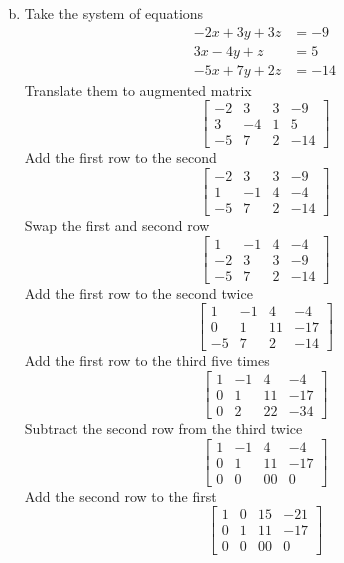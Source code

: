 \documentclass[../main.tex]{subfiles}
\begin{document}
\solution
\begin{enumerate}[a)]
	\setcounter{enumi}{1}
	\item 
		Take the system of equations
		\begin{align*}
			-2x + 3y + 3z &= -9 \\
			3x - 4y + z &= 5 \\
			-5x + 7y + 2z &= -14
		\end{align*}
		Translate them to augmented matrix
		$$\left[\begin{array}{ccc|c}
			-2 & 3 & 3 & -9 \\
			3 & -4 & 1 & 5 \\
			-5 & 7 & 2 & -14
		\end{array}\right]$$
		Add the first row to the second
		$$\left[\begin{array}{ccc|c}
			-2 & 3 & 3 & -9 \\
			1 & -1 & 4 & -4 \\
			-5 & 7 & 2 & -14
		\end{array}\right]$$
		Swap the first and second row
		$$\left[\begin{array}{ccc|c}
			1 & -1 & 4 & -4 \\
			-2 & 3 & 3 & -9 \\
			-5 & 7 & 2 & -14
		\end{array}\right]$$
		Add the first row to the second twice
		$$\left[\begin{array}{ccc|c}
			1 & -1 & 4 & -4 \\
			0 & 1 & 11 & -17 \\
			-5 & 7 & 2 & -14
		\end{array}\right]$$
		Add the first row to the third five times
		$$\left[\begin{array}{ccc|c}
			1 & -1 & 4 & -4 \\
			0 & 1 & 11 & -17 \\
			0 & 2 & 22 & -34
		\end{array}\right]$$
		Subtract the second row from the third twice
		$$\left[\begin{array}{ccc|c}
			1 & -1 & 4 & -4 \\
			0 & 1 & 11 & -17 \\
			0 & 0 & 00 & 0
		\end{array}\right]$$
		Add the second row to the first
		$$\left[\begin{array}{ccc|c}
			1 & 0 & 15 & -21 \\
			0 & 1 & 11 & -17 \\
			0 & 0 & 00 & 0
		\end{array}\right]$$

\end{enumerate}
\end{document}
